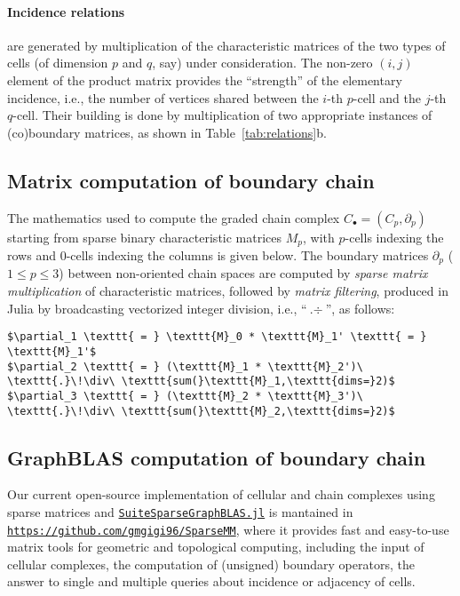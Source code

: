 \paragraph{Incidence relations} are generated by multiplication of the characteristic matrices of the two types of cells (of dimension $p$ and $q$, say) under consideration. The non-zero $(i,j)$ element of the product matrix provides the ``strength'' of the elementary incidence, i.e., the number of vertices shared between the $i$-th $p$-cell and the $j$-th $q$-cell.  Their building is done by multiplication of two appropriate instances of (co)boundary matrices, as shown in Table~\ref{tab:relations}b.


\subsection{Matrix computation of boundary chain}

The mathematics used to compute the graded chain complex $C_\bullet = (C_p, \partial_p)$ starting from sparse binary characteristic matrices $M_p$, with $p$-cells indexing the rows and $0$-cells indexing the columns is given below.
The boundary matrices $\partial_p$ ($1\leq p\leq 3$) between non-oriented chain spaces are computed by \emph{sparse matrix multiplication} of characteristic matrices, followed by \emph{matrix filtering},  produced in Julia by broadcasting vectorized integer division, i.e., ``$\texttt{.}\!\div$'', as follows:

{\footnotesize\begin{lstlisting}
$\partial_1 \texttt{ = } \texttt{M}_0 * \texttt{M}_1' \texttt{ = } \texttt{M}_1'$  
$\partial_2 \texttt{ = } (\texttt{M}_1 * \texttt{M}_2')\ \texttt{.}\!\div\ \texttt{sum(}\texttt{M}_1,\texttt{dims=}2)$
$\partial_3 \texttt{ = } (\texttt{M}_2 * \texttt{M}_3')\ \texttt{.}\!\div\ \texttt{sum(}\texttt{M}_2,\texttt{dims=}2)$
\end{lstlisting}}


\subsection{GraphBLAS computation of boundary chain}

Our current open-source implementation of cellular and chain complexes using sparse matrices and \href{https://github.com/abhinavmehndiratta/GraphBLAS.jl}{\texttt{SuiteSparseGraphBLAS.jl}} is mantained in \href{https://github.com/gmgigi96/SparseMM}{\texttt{https://github.com/gmgigi96/SparseMM}}, where it provides fast and easy-to-use matrix tools for geometric and topological computing, including the input of cellular complexes, the computation of (unsigned) boundary operators, the answer to single and multiple queries about incidence or adjacency of cells.

